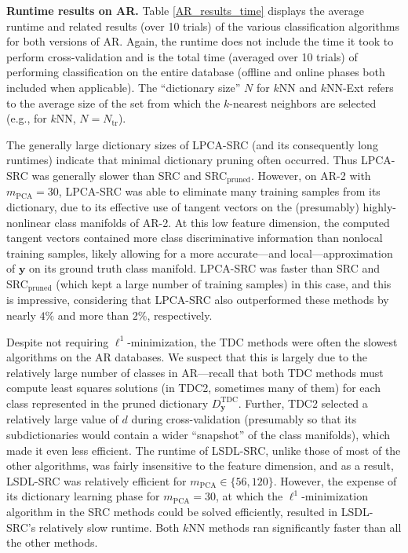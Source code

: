 \documentclass[review]{elsarticle}
\begin{document}
\textbf{Runtime results on AR.} Table \ref{AR_results_time} displays the average runtime and related results (over 10 trials) of the various classification algorithms for both versions of AR. Again, the runtime does not include the time it took to perform cross-validation and is the total time (averaged over 10 trials) of performing classification on the entire database (offline and online phases both included when applicable). The ``dictionary size'' $N$ for $k$NN and $k$NN-Ext refers to the average size of the set from which the $k$-nearest neighbors are selected (e.g., for $k$NN, $N = N_\text{tr}$). 

The generally large dictionary sizes of LPCA-SRC (and its consequently long runtimes) indicate that minimal dictionary pruning often occurred. Thus LPCA-SRC was generally slower than SRC and SRC$_\mathrm{pruned}$. However, on AR-2 with $m_\mathrm{PCA}=30$, LPCA-SRC was able to eliminate many training samples from its dictionary, due to its effective use of tangent vectors on the (presumably) highly-nonlinear class manifolds of AR-2. At this low feature dimension, the computed tangent vectors contained more class discriminative information than nonlocal training samples, likely allowing for a more accurate---and local---approximation of $\bm{y}$ on its ground truth class manifold. LPCA-SRC was faster than SRC and SRC$_\mathrm{pruned}$ (which kept a large number of training samples) in this case, and this is impressive, considering that LPCA-SRC also outperformed these methods by nearly $4\%$ and more than $2\%$, respectively.


Despite not requiring $\ell^1$-minimization, the TDC methods were often the slowest algorithms on the AR databases. We suspect that this is largely due to the relatively large number of classes in AR---recall that both TDC methods must compute least squares solutions (in TDC2, sometimes many of them) for each class represented in the pruned dictionary $D_{\bm{y}}^{\mathrm{TDC}}$. Further, TDC2 selected a relatively large value of $d$ during cross-validation (presumably so that its subdictionaries would contain a wider ``snapshot'' of the class manifolds), which made it even less efficient. The runtime of LSDL-SRC, unlike those of most of the other algorithms, was fairly insensitive to the feature dimension, and as a result, LSDL-SRC was relatively efficient for $m_\mathrm{PCA} \in \{56,120\}$. However, the expense of its dictionary learning phase for $m_\mathrm{PCA}=30$, at which the $\ell^1$-minimization algorithm in the SRC methods could be solved efficiently, resulted in LSDL-SRC's relatively slow runtime. Both $k$NN methods ran significantly faster than all the other methods.
\end{document}
